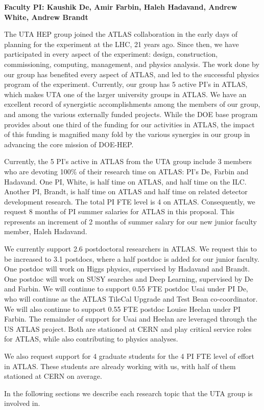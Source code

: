
\textbf{Faculty PI: Kaushik De, Amir Farbin, Haleh Hadavand, Andrew White, Andrew Brandt}

The UTA HEP group joined the ATLAS collaboration in the early days of planning for the 
experiment at the LHC, 21 years ago. Since then, we have participated in every aspect 
of the experiment: design, construction, commissioning, computing, management, and 
physics analysis. 
The work done by our group has benefited every aspect of ATLAS, and led to the 
successful physics program of the experiment. 
Currently, our group has 5 active PI's in ATLAS, which makes UTA one of the larger 
university groups in ATLAS. We have an excellent record of synergistic accomplishments 
among the members of our group, and among the various externally funded projects. 
While the DOE base program provides about one third of the funding for our activities in ATLAS, the impact of 
this funding is magnified many fold by the various synergies in our group  
in advancing the core mission of DOE-HEP.

Currently, the 5 PI's active in ATLAS from the UTA group include 3 members who are 
devoting 100\% of their research time on ATLAS: PI's De, Farbin and Hadavand. 
One PI, White, is half time on ATLAS, and half time on the ILC. 
Another PI, Brandt, is half time on ATLAS and half time on related detector development research. 
The total PI FTE level is 4 on ATLAS. Consequently, we request 8 months of PI summer salaries for ATLAS in 
this proposal. This represents an increment of 2 months of summer salary for our 
new junior faculty member, Haleh Hadavand.

We currently support 2.6 postdoctoral researchers in ATLAS. We request this to be increased to 3.1 postdocs, 
where a half postdoc is added for our junior faculty. One postdoc will work on Higgs physics, 
supervised by Hadavand and Brandt. One postdoc will work on SUSY searches and Deep Learning, supervised
by De and Farbin. We will continue to support 0.55 FTE postdoc Usai under PI De, who will
continue as the ATLAS TileCal Upgrade and Test Bean co-coordinator. We will also continue 
to support 0.55 FTE postdoc Louise Heelan under PI Farbin. The remainder of support for Usai and Heelan are 
leveraged through the US ATLAS project. Both are stationed at CERN and play critical service roles
for ATLAS, while also contributing to physics analyses.

We also request support for 4 graduate students for the 4 PI FTE level of effort in ATLAS. These
students are already working with us, with half of them stationed at CERN on average.

In the following sections we describe each research topic that the UTA group is involved in.